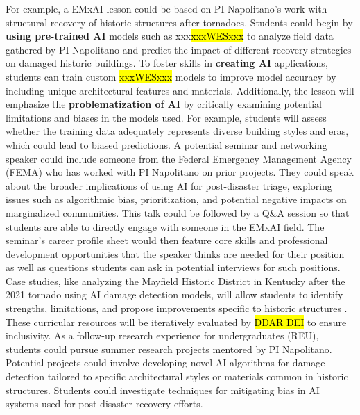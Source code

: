 \documentclass[11pt]{article}
\begin{document}
For example, a EMxAI lesson could be based on PI Napolitano's work with structural recovery of historic structures after tornadoes.  
Students could begin by \textbf{using pre-trained AI} models such as xxx\hl{xxxWESxxx} to analyze field data gathered by PI Napolitano\cite{pointCloudsDone} and predict the impact of different recovery strategies on damaged historic buildings.
To foster skills in \textbf{creating AI} applications, students can train custom \hl{xxxWESxxx} models to improve model accuracy by including unique architectural features and materials. 
Additionally, the lesson will emphasize the \textbf{problematization of AI} by critically examining potential limitations and biases in the models used. For example, students will assess whether the training data adequately represents diverse building styles and eras, which could lead to biased predictions.
A potential seminar and networking speaker could include someone from the Federal Emergency Management Agency (FEMA) who has worked with PI Napolitano on prior projects. They could speak about the broader implications of using AI for post-disaster triage, exploring issues such as algorithmic bias, prioritization, and potential negative impacts on marginalized communities. 
This talk could be followed by a Q\&A session so that students are able to directly engage with someone in the EMxAI field. 
The seminar's career profile sheet would then feature core skills and professional development opportunities that the speaker thinks are needed for their position as well as questions students can ask in potential interviews for such positions.
Case studies, like analyzing the Mayfield Historic District in Kentucky after the 2021 tornado using AI damage detection models, will allow students to identify strengths, limitations, and propose improvements specific to historic structures \cite{our work}.
These curricular resources will be iteratively evaluated by \hl{DDAR DEI} to ensure inclusivity.
As a follow-up research experience for undergraduates (REU), students could pursue summer research projects mentored by PI Napolitano. Potential projects could involve developing novel AI algorithms for damage detection tailored to specific architectural styles or materials common in historic structures. Students could investigate techniques for mitigating bias in AI systems used for post-disaster recovery efforts. 




\end{document}
